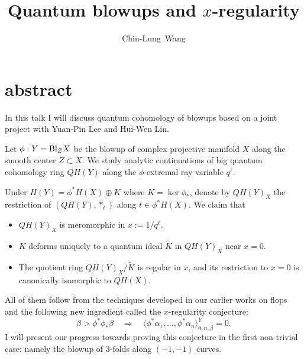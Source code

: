 \documentclass[11pt]{amsart}
\begin{document}
\author{Chin-Lung~Wang}
\address{Department of Mathematics,
National Taiwan University, Taipei, Taiwan}


\title{Quantum blowups and $x$-regularity}
\maketitle

\section*{abstract} 
In this talk I will discuss quantum cohomology of blowups based on a joint project with Yuan-Pin Lee and Hui-Wen Lin.  

Let $\phi: Y = {\rm Bl}_Z X$ be the blowup of complex projective manifold $X$ along the smooth center $Z \subset X$. We study analytic continuations of big quantum cohomology ring $QH(Y)$ along the $\phi$-extremal ray variable $q^{\ell}$. 

Under $H(Y) = \phi^* H(X) \oplus K$ where $K = \ker \phi_*$, denote by $QH(Y)_X$ the restriction of $(QH(Y), *_t)$ along $t \in \phi^*H(X)$. We claim that 
\begin{itemize}
\item[(i)] $QH(Y)_X$ is meromorphic in $x := 1/q^\ell$.
\item[(ii)] $K$ deforms uniquely to a quantum ideal $\widetilde K$ in $QH(Y)_X$ near $x = 0$.
\item[(iii)] The quotient ring $QH(Y)_X/\widetilde K$ is regular in $x$, and its restriction to $x = 0$ is canonically isomorphic to $QH(X)$. 
\end{itemize}

All of them follow from the techniques developed in our earlier works on flops and the following new ingredient called the $x$-regularity conjecture: 
$$
\beta > \phi^*\phi_*\beta \quad \Longrightarrow \quad \langle \phi^*\alpha_1, \ldots, \phi^*\alpha_n\rangle^Y_{0, n,\beta} = 0.
$$
I will present our progress towards proving this conjecture in the first non-trivial case: namely the blowup of 3-folds along $(-1, -1)$ curves.   
\end{document}
